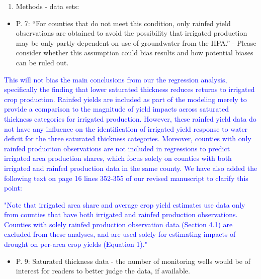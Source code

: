 \documentclass[
]{article}
\providecommand{\tightlist}{%
  \setlength{\itemsep}{0pt}\setlength{\parskip}{0pt}}
\begin{document}
\begin{enumerate}
\def\labelenumi{\arabic{enumi}.}
\setcounter{enumi}{5}
\tightlist
\item
  Methods - data sets:
\end{enumerate}

\begin{itemize}
\tightlist
\item
  P. 7: ``For counties that do not meet this condition, only rainfed
  yield observations are obtained to avoid the possibility that
  irrigated production may be only partly dependent on use of
  groundwater from the HPA.'' - Please consider whether this assumption
  could bias results and how potential biases can be ruled out.
\end{itemize}

\textcolor{blue}{
This will not bias the main conclusions from our the regression analysis, specifically the finding that lower saturated thickness reduces returns to irrigated crop production. Rainfed yields are included as part of the modeling merely to provide a comparison to the magnitude of yield impacts across saturated thickness categories for irrigated production. However, these rainfed yield data do not have any influence on the identification of irrigated yield response to water deficit for the three saturated thickness categories. Moreover, counties with only rainfed production observations are not included in regressions to predict irrigated area production shares, which focus solely on counties with both irrigated and rainfed production data in the same county. We have also added the following text on page 16 lines 352-355 of our revised manuscript to clarify this point:}

\textcolor{blue}{"Note that irrigated area share and average crop yield estimates use  data only from counties that have both irrigated and rainfed production observations. Counties with solely rainfed production observation data (Section 4.1) are excluded from these analyses, and are used solely for estimating impacts of drought on per-area crop yields (Equation 1)."}

\begin{itemize}
\tightlist
\item
  P. 9: Saturated thickness data - the number of monitoring wells would
  be of interest for readers to better judge the data, if available.
\end{itemize}
\end{document}
